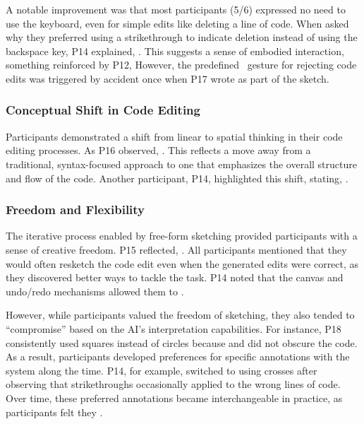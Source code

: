 A notable improvement was that most participants (5/6) expressed no need to use the keyboard, even for simple edits like deleting a line of code. When asked why they preferred using a strikethrough to indicate deletion instead of using the backspace key, P14 explained, . This suggests a sense of embodied interaction, something reinforced by P12,  However, the predefined \faTimes ~gesture for rejecting code edits was triggered by accident once when P17 wrote  as part of the sketch.

\subsubsection{Conceptual Shift in Code Editing}
\label{sec:conceptual_shift}
Participants demonstrated a shift from linear to spatial thinking in their code editing processes. As P16 observed, . This reflects a move away from a traditional, syntax-focused approach to one that emphasizes the overall structure and flow of the code. Another participant, P14, highlighted this shift, stating, .

\subsubsection{Freedom and Flexibility}
The iterative process enabled by free-form sketching provided participants with a sense of creative freedom. P15 reflected, . All participants mentioned that they would often resketch the code edit even when the generated edits were correct, as they discovered better ways to tackle the task. P14 noted that the canvas and undo/redo mechanisms allowed them to . 

However, while participants valued the freedom of sketching, they also tended to ``compromise'' based on the AI’s interpretation capabilities. For instance, P18 consistently used squares instead of circles because  and did not obscure the code. As a result, participants developed preferences for specific annotations with the system along the time. P14, for example, switched to using crosses after observing that strikethroughs occasionally applied to the wrong lines of code. Over time, these preferred annotations became interchangeable in practice, as participants felt they .


